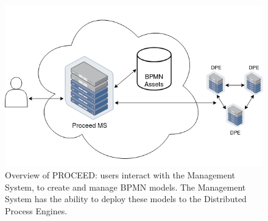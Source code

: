 \begin{figure}[H]
    \centering
    \includegraphics[scale=0.45]{images/quick-ms-overview.drawio.png}
    \caption{Overview of PROCEED: users interact with the Management System, to create and
    manage BPMN models. The Management System has the ability to deploy these models to the Distributed Process Engines.}
    \label{fig:proceed-overview}
    \vspace{-1em} %
\end{figure}




